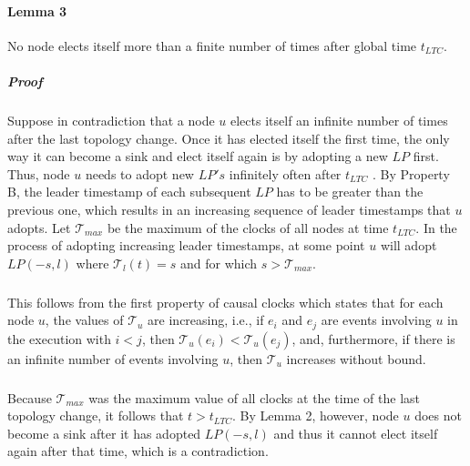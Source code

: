 \paragraph{Lemma 3}No node elects itself more than a finite number of times after global time $t_{LTC}$.
\subparagraph{Proof}Suppose in contradiction that a node $u$ elects itself an infinite number of times after the last topology change. Once it has elected itself the first time, the only way it can become a sink and elect itself again is by adopting a new $LP$ first. Thus, node $u$ needs to adopt new $LP's$ infinitely often after $t_{LTC}$ . By Property B, the leader timestamp of each subsequent $LP$ has to be greater than the previous one, which results in an increasing sequence of leader timestamps that $u$ adopts. Let $\mathcal{T}_{max}$ be the maximum of the clocks of all nodes at time $t_{LTC}$. In the process of adopting increasing leader timestamps, at some point $u$ will adopt $LP(-s, l)$ where $\mathcal{T} _l (t) = s$ and for which $s > \mathcal{T} _{max}$.
\subparagraph{}This follows from the first property of causal clocks which states that for each node $u$, the values of $\mathcal{T}_u$ are increasing, i.e., if $e_i$ and $e_j$ are events involving $u$ in the execution with $i < j$, then $\mathcal{T} _u (e_i ) < \mathcal{T} _u (e_j )$, and, furthermore, if there is an infinite number of events involving $u$, then $\mathcal{T} _u$ increases without bound. 
\subparagraph{}Because $\mathcal{T} _{max}$ was the maximum value of all clocks at the time of the last topology change, it follows that $t > t_{LTC}$. By Lemma 2, however, node $u$ does not become a sink after it has adopted $LP(-s, l)$ and thus it cannot elect itself again after that time, which is a contradiction.
